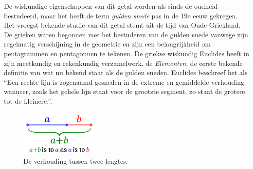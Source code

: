 \documentclass{article}
\begin{document}
De wiskundige eigenschappen van dit getal worden als sinds de oudheid bestudeerd, maar het heeft de term \textit{gulden snede} pas in de 19e eeuw gekregen. Het vroegst bekende studie van dit getal stemt uit de tijd van Oude Griekland. De grieken waren begonnen met het bestuderen van de gulden snede vanwege zijn regelmatig verschijning in de geometrie en zijn een belangrijkheid om pentagrammen en pentagonnen te tekenen. De griekse wiskundig Euclides heeft in zijn meetkundig en rekenkundig verzamelwerk, de \textit{Elementen}, de eerste bekende definitie van wat nu bekend staat als de gulden sneden. Euclides beschreef het als ``Een rechte lijn is zogenaamd gesneden in de extreme en gemiddelde verhouding wanneer, zoals het gehele lijn staat voor de grootste segment, zo staat de grotere tot de kleinere.''.


\begin{figure}[Hh]
		\centering
		\includegraphics[width=0.35\textwidth]{golden-ratio-line.png}
		\caption{De verhouding tussen twee lengtes.}
		\label{fig:ratio-lines}
	\end{figure}
\end{document}
